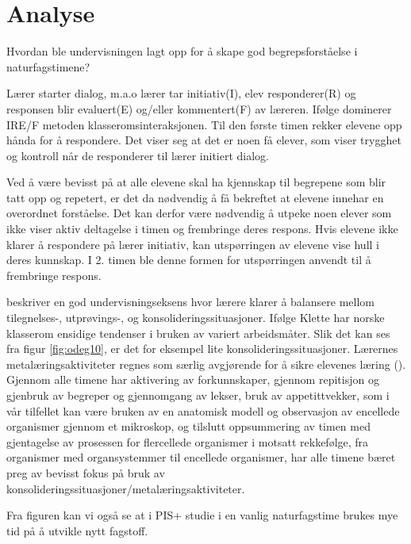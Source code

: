 \documentclass[main.tex]{subfiles}
\begin{document}
\section*{Analyse}
\label{sec:2}
Hvordan ble undervisningen lagt opp for å skape god begrepsforståelse i naturfagstimene?

Lærer starter dialog, m.a.o lærer tar initiativ(I), elev responderer(R) og responsen blir
evaluert(E) og/eller kommentert(F) av læreren. Ifølge  dominerer IRE/F 
metoden klasseromsinteraksjonen. Til den første timen rekker elevene opp hånda for å 
respondere. Det viser seg at det er noen få elever, som viser trygghet og kontroll når 
de responderer til lærer initiert dialog. 

Ved å være bevisst på at alle elevene skal ha kjennskap til 
begrepene som blir tatt opp og repetert, er det da nødvendig å få bekreftet at elevene innehar en 
overordnet forståelse. Det kan derfor være nødvendig å utpeke noen elever som ikke viser aktiv 
deltagelse i timen og frembringe deres respons. Hvis elevene ikke klarer å respondere på lærer 
initiativ, kan utspørringen av elevene vise hull i deres kunnskap. I 2. timen ble denne formen for
utspørringen anvendt til å frembringe respons. 



 beskriver en god undervisningseksens hvor lærere klarer å balansere mellom tilegnelses-,
utprøvings-, og konsolideringssituasjoner. Ifølge Klette har norske klasserom ensidige tendenser i bruken av 
variert arbeidsmåter. Slik det kan ses fra figur \ref{fig:odeg10}, er det for eksempel lite konsolideringssituasjoner.
Lærernes metalæringsaktiviteter regnes som særlig avgjørende for å sikre elevenes læring ().
Gjennom alle timene har aktivering av forkunnskaper, gjennom repitisjon og gjenbruk av begreper og gjennomgang av 
lekser, bruk av appetittvekker, som i vår tilfellet kan være bruken av en anatomisk modell og observasjon av
encellede organismer gjennom et mikroskop, og tilslutt oppsummering av timen med gjentagelse av prosessen
for flercellede organismer i motsatt rekkefølge, fra organismer med organsystemmer til encellede organismer, har 
alle timene bæret preg av bevisst fokus på bruk av konsolideringssituasjoner/metalæringsaktiviteter. 

Fra figuren kan vi også se at i PIS+ studie i en vanlig naturfagstime brukes mye tid på å utvikle nytt fagstoff.
\end{document}
